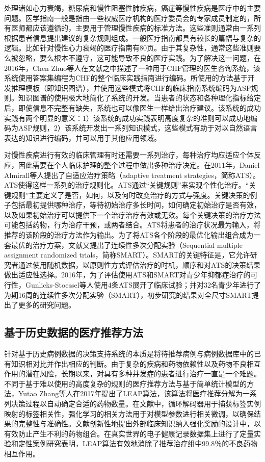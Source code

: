 处理诸如心力衰竭，糖尿病和慢性阻塞性肺疾病，癌症等慢性疾病是医疗中的主要问题。医学指南一般是指由一些权威医疗机构的医疗委员会的专家成员制定的，所有医师都应该遵循的，主要用于管理慢性疾病的标准方法。这些准则通常由一系列
根据患者信息提出建议的复杂规则组成。一般医疗指南都具有较长的篇幅与复杂的逻辑。比如针对慢性心力衰竭的医疗指南有80页。由于其复杂性，通常这些准则要么被忽略，要么根本不遵守，这可能导致不良的医疗实践。为了解决这一问题，在2016年，Chen Zhuo等人在文献\parencite{Chen2016A}之中描述了一种用于CHF管理的医生咨询系统，该系统使用答案集编程为CHF的整个临床实践指南进行编码。所使用的方法基于开发推理模板（即知识图谱），并使用这些模式将CHF的临床指南系统编码为ASP规则。知识图谱的使用极大地简化了系统的开发。当患者的状态和各种理化指标给定后，即使信息不完整有缺失，系统也可以像医生一样给出治疗建议。该系统的成功实践有两个明显的意义：1）该系统的成功实践表明高度复杂的准则可以成功地编码为ASP规则，2）该系统开发出一系列知识模式，这些模式有助于对以自然语言表达的知识进行编码，并可以用于其他应用领域。

对慢性疾病进行有效的临床管理有时还需要一系列治疗，每种治疗均应适应个体反应，因此需要在个人临床护理的整个过程中做出多种治疗决定。在2011年，Daniel Almirall等人提出了自适应治疗策略（adaptive treatment strategies，简称ATS）\cite{Daniel2012Designing}。ATS使得这样一系列的治疗规则化。ATS通过“关键规则”来实现个性化治疗。“关键规则”主要定义了是否，如何，以及何时改变治疗的方式与强度。关键决策的例子包括最初提供哪种治疗，等待初始治疗多长时间，如何确定初始治疗是否有效，以及如果初始治疗可以提供下一个治疗治疗有效或无效。每个关键决策的治疗方法可能包括药物，行为治疗干预，或两者结合。ATS将患者的治疗状况最为输入，将推荐的该阶段的治疗方法作为输出。为了将ATS各个阶段的最优化输出组合成为一套最优的治疗方案，文献\parencite{Daniel2012Designing}又提出了连续性多次分配实验（Sequential multiple assignment randomized trials，简称SMART）。SMART的关键特征是，它允许研究者通过使用随机数据，以原则性方式评估治疗的时机，顺序和对ATS的决策结果做出适应性选择。2016年，为了评估使用ATS和SMART对青少年抑郁症治疗的可行性，Gunlicks-Stoessel等人使用4条ATS展开了临床试验\cite{Gunlicks2017A}；并对32名青少年进行了为期16周的连续性多次分配实验（SMART），初步研究的结果对全尺寸SMART提出了更多的研究问题。


\subsection{基于历史数据的医疗推荐方法}
针对基于历史病例数据的决策支持系统的本质是将待推荐病例与病例数据库中的已有知识相对比并作出相应的判断。由于复杂的疾病和药物依赖性以及药物不良相互作用的潜在风险，长期以来，对具有多种并发症的患者进行治疗一直是一个难题。不同于基于难以使用的高度复杂的规则的医疗推荐方法与基于简单统计模型的方法，Yutao Zhang等人在2017年提出了LEAP算法\cite{Zhang2017LEAP}，该算法将医疗推荐分解为一系列决策过程以自动确定合适的药物数量。在文献\parencite{Zhang2017LEAP}中，循环解码器用于捕获标签实例映射的标签相关性，强化学习的相关方法用于对模型参数进行相关微调，以确保结果的完整性与准确性。文献\parencite{Zhang2017LEAP}创新性地提出外部临床知识纳入强化奖励的设计中，以有效防止产生不利的药物组合。在真实世界的电子健康记录数据集上进行了定量实验和定性案例研究表明，LEAP算法有效地消除了推荐治疗组中99.8％的不良药物相互作用。

